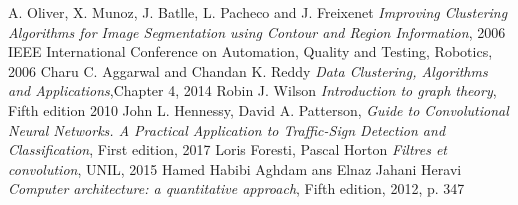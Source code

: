 \documentclass{usiinftr}
\begin{document}
\begin{thebibliography}{1}
		A. Oliver, X. Munoz, J. Batlle, L. Pacheco and J. Freixenet
		\textit{Improving Clustering Algorithms for Image Segmentation using Contour and Region Information},
		2006 IEEE International Conference on Automation, Quality and Testing, Robotics,
		2006
		Charu C. Aggarwal  and Chandan K. Reddy
		\textit{Data Clustering, Algorithms and Applications},Chapter 4,
		2014
		Robin J. Wilson
		\textit{Introduction to graph theory}, Fifth edition
		2010
		John L. Hennessy, David A. Patterson,
		\textit{Guide to Convolutional Neural Networks. A Practical Application to Traffic-Sign Detection and Classification}, First edition,
		2017
		Loris Foresti, Pascal Horton
		\textit{Filtres et convolution}, UNIL,
		2015
		Hamed Habibi Aghdam ans Elnaz Jahani Heravi
		\textit{Computer architecture: a quantitative approach}, Fifth edition,
		2012, p. 347
\end{thebibliography}


\end{document}
